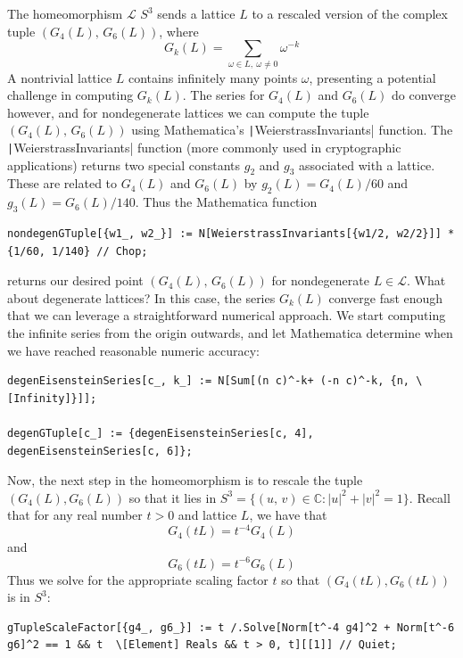 \documentclass[12pt,twoside]{reedthesis}
\theoremstyle{definition}
\newcommand{\C}{\mathbb{C}}
\newcommand{\LS}{\mathcal{L}}
\begin{document}
The homeomorphism $\LS$ $S^3$ sends a lattice $L$ to a rescaled version of the complex tuple $(G_4(L),\, G_6(L))$, where
\begin{equation*}
  G_k(L) = \sum_{\omega \in L,\ \omega \neq 0} \omega^{-k}
\end{equation*}
A nontrivial lattice $L$ contains infinitely many points $\omega$, presenting a potential challenge in computing $G_k(L)$.
The series for $G_4(L)$ and $G_6(L)$ do converge however, and for nondegenerate lattices we can compute the tuple $(G_4(L),\, G_6(L))$ using Mathematica's \texttt|WeierstrassInvariants| function.
The \texttt|WeierstrassInvariants| function (more commonly used in cryptographic applications) returns two special constants $g_2$ and $g_3$ associated with a lattice.
These are related to $G_4(L)$ and $G_6(L)$ by $g_2(L) = G_4(L) / 60$ and $g_3(L) = G_6(L) / 140$.
Thus the Mathematica function
\begin{verbatim}
nondegenGTuple[{w1_, w2_}] := N[WeierstrassInvariants[{w1/2, w2/2}]] * {1/60, 1/140} // Chop;
\end{verbatim}
returns our desired point $(G_4(L),\, G_6(L))$ for nondegenerate $L \in \LS$.
What about degenerate lattices?
In this case, the series $G_k(L)$ converge fast enough that we can leverage a straightforward numerical approach.
We start computing the infinite series from the origin outwards, and let Mathematica determine when we have reached reasonable numeric accuracy:
\begin{verbatim}
degenEisensteinSeries[c_, k_] := N[Sum[(n c)^-k+ (-n c)^-k, {n, \[Infinity]}]];

degenGTuple[c_] := {degenEisensteinSeries[c, 4], degenEisensteinSeries[c, 6]};
\end{verbatim}
Now, the next step in the homeomorphism is to rescale the tuple $(G_4(L), G_6(L))$ so that it lies in $S^3 = \{(u,\, v) \in \C : |u|^2 + |v|^2 = 1\}$.
Recall that for any real number $t > 0$ and lattice $L$, we have that
\begin{equation*}
  G_4(tL) = t^{-4}G_4(L)
\end{equation*}
and
\begin{equation*}
  G_6(tL) = t^{-6} G_6(L)
\end{equation*}
Thus we solve for the appropriate scaling factor $t$ so that $(G_4(tL), G_6(tL))$ is in $S^3$:
\begin{verbatim}
gTupleScaleFactor[{g4_, g6_}] := t /.Solve[Norm[t^-4 g4]^2 + Norm[t^-6 g6]^2 == 1 && t  \[Element] Reals && t > 0, t][[1]] // Quiet;
\end{verbatim}
\end{document}
